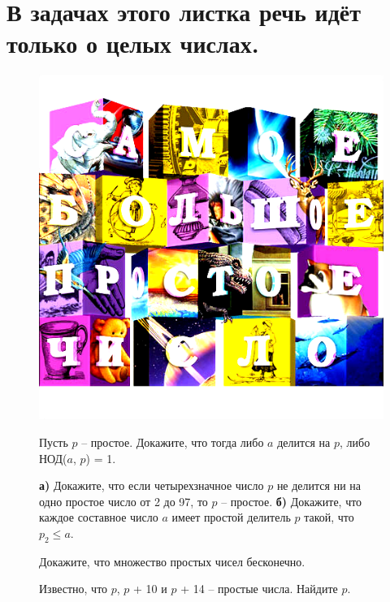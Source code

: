 
\section{В задачах этого листка речь идёт только о целых числах.}

\begin{figure}[h]


    \begin{minipage}{0.25\linewidth}
        \includegraphics[width=0.95\columnwidth]{img/11.5 sbpch.png}
    \end{minipage}
    \hfill
    \begin{minipage}{0.73\linewidth}
\begin{thm}
    Пусть $p$ -- простое. Докажите, что тогда либо $a$ делится на $p$, либо НОД($a$, $p$) = 1.
\end{thm}

\begin{thm}
    \textbf{а)} Докажите, что если четырехзначное число $p$ не делится ни на одно простое число от 2 до 97, то $p$ -- простое. \textbf{б)} Докажите, что каждое составное число $a$ имеет простой делитель $p$ такой, что $p_2 \leq a$.
\end{thm}

\begin{thm}
    Докажите, что множество простых чисел бесконечно.
\end{thm}

\begin{thm}
    Известно, что $p$, $p$ + 10 и $p$ + 14 -- простые числа. Найдите $p$.
\end{thm}

        
    \end{minipage}

\end{figure}
    
